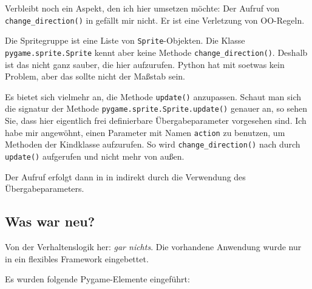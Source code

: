 Verbleibt noch ein Aspekt, den ich hier umsetzen möchte: Der Aufruf von \texttt{change\_di\-rec\-tion()} in  gefällt mir nicht. Er ist eine Verletzung von OO-Regeln. 

Die Spritegruppe ist eine Liste von \texttt{Sprite}-Objekten. Die Klasse \texttt{pygame.sprite.Sprite} kennt aber keine Methode \texttt{change\_direction()}. Deshalb ist das nicht ganz sauber, die hier aufzurufen. Python hat mit soetwas kein Problem, aber das sollte nicht der Maßstab sein. 

Es bietet sich vielmehr an, die Methode \texttt{update()} anzupassen. Schaut man sich die \gls{signatur} der Methode \texttt{pygame.sprite.Sprite.update()} genauer an, so sehen Sie, dass hier eigentlich frei definierbare Übergabeparameter vorgesehen sind.  Ich habe mir angewöhnt, einen Parameter mit Namen \texttt{action} zu benutzen, um Methoden der Kindklasse aufzurufen. So wird \texttt{change\_direction()} nach  durch \texttt{update()} aufgerufen und nicht mehr von außen.


Der Aufruf erfolgt dann in  in  indirekt durch die Verwendung des Übergabeparameters.


\subsection*{Was war neu?}

Von der Verhaltenslogik her: \emph{gar nichts}. Die vorhandene Anwendung wurde nur in ein flexibles Framework eingebettet. 

Es wurden folgende Pygame-Elemente eingeführt:

